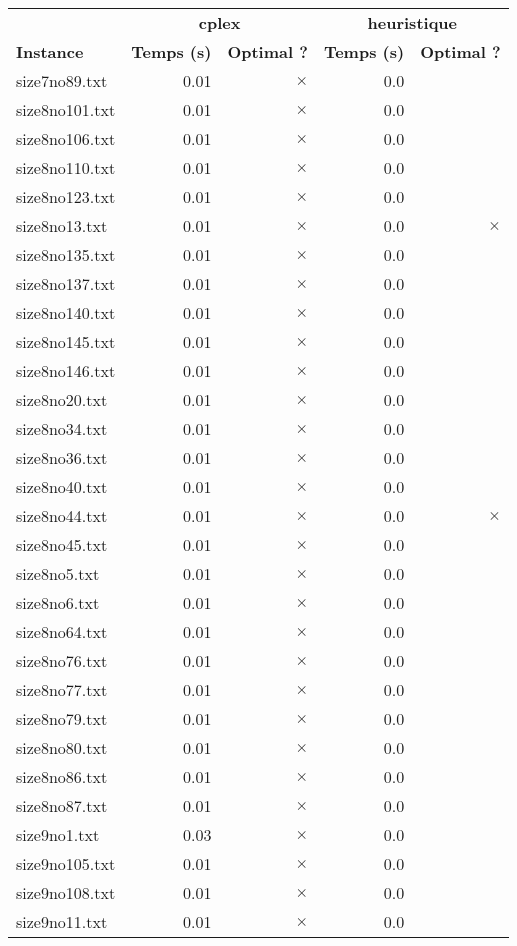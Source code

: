 \documentclass{article}
\begin{document}
\newpage
\begin{center}
\renewcommand{\arraystretch}{1.4} 
 \begin{tabular}{lrrrr}
	\hline
 & \multicolumn{2}{c}{\textbf{cplex}} & \multicolumn{2}{c}{\textbf{heuristique}}\\
\textbf{Instance}  & \textbf{Temps (s)} & \textbf{Optimal ?}  & \textbf{Temps (s)} & \textbf{Optimal ?} \\\hline

size7no89.txt & 0.01 & 
$\times$
 & 0.0 & 
\\
size8no101.txt & 0.01 & 
$\times$
 & 0.0 & 
\\
size8no106.txt & 0.01 & 
$\times$
 & 0.0 & 
\\
size8no110.txt & 0.01 & 
$\times$
 & 0.0 & 
\\
size8no123.txt & 0.01 & 
$\times$
 & 0.0 & 
\\
size8no13.txt & 0.01 & 
$\times$
 & 0.0 & 
$\times$
\\
size8no135.txt & 0.01 & 
$\times$
 & 0.0 & 
\\
size8no137.txt & 0.01 & 
$\times$
 & 0.0 & 
\\
size8no140.txt & 0.01 & 
$\times$
 & 0.0 & 
\\
size8no145.txt & 0.01 & 
$\times$
 & 0.0 & 
\\
size8no146.txt & 0.01 & 
$\times$
 & 0.0 & 
\\
size8no20.txt & 0.01 & 
$\times$
 & 0.0 & 
\\
size8no34.txt & 0.01 & 
$\times$
 & 0.0 & 
\\
size8no36.txt & 0.01 & 
$\times$
 & 0.0 & 
\\
size8no40.txt & 0.01 & 
$\times$
 & 0.0 & 
\\
size8no44.txt & 0.01 & 
$\times$
 & 0.0 & 
$\times$
\\
size8no45.txt & 0.01 & 
$\times$
 & 0.0 & 
\\
size8no5.txt & 0.01 & 
$\times$
 & 0.0 & 
\\
size8no6.txt & 0.01 & 
$\times$
 & 0.0 & 
\\
size8no64.txt & 0.01 & 
$\times$
 & 0.0 & 
\\
size8no76.txt & 0.01 & 
$\times$
 & 0.0 & 
\\
size8no77.txt & 0.01 & 
$\times$
 & 0.0 & 
\\
size8no79.txt & 0.01 & 
$\times$
 & 0.0 & 
\\
size8no80.txt & 0.01 & 
$\times$
 & 0.0 & 
\\
size8no86.txt & 0.01 & 
$\times$
 & 0.0 & 
\\
size8no87.txt & 0.01 & 
$\times$
 & 0.0 & 
\\
size9no1.txt & 0.03 & 
$\times$
 & 0.0 & 
\\
size9no105.txt & 0.01 & 
$\times$
 & 0.0 & 
\\
size9no108.txt & 0.01 & 
$\times$
 & 0.0 & 
\\
size9no11.txt & 0.01 & 
$\times$
 & 0.0 & 
\\
\hline\end{tabular}
\end{center}
\end{document}
